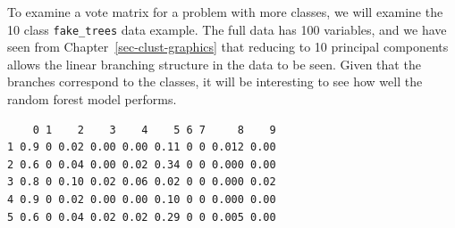 \documentclass[
  letterpaper,
]{krantz}
\newenvironment{Shaded}{\begin{snugshade}}{\end{snugshade}}
\newcommand{\AttributeTok}[1]{\textcolor[rgb]{0.40,0.45,0.13}{#1}}
\newcommand{\ConstantTok}[1]{\textcolor[rgb]{0.56,0.35,0.01}{#1}}
\newcommand{\DecValTok}[1]{\textcolor[rgb]{0.68,0.00,0.00}{#1}}
\newcommand{\FunctionTok}[1]{\textcolor[rgb]{0.28,0.35,0.67}{#1}}
\newcommand{\NormalTok}[1]{\textcolor[rgb]{0.00,0.23,0.31}{#1}}
\newcommand{\OtherTok}[1]{\textcolor[rgb]{0.00,0.23,0.31}{#1}}
\newcommand{\SpecialCharTok}[1]{\textcolor[rgb]{0.37,0.37,0.37}{#1}}
\begin{document}
To examine a vote matrix for a problem with more classes, we will
examine the 10 class \texttt{fake\_trees} data example. The full data
has 100 variables, and we have seen from
Chapter~\ref{sec-clust-graphics} that reducing to 10 principal
components allows the linear branching structure in the data to be seen.
Given that the branches correspond to the classes, it will be
interesting to see how well the random forest model performs.


\begin{Shaded}
\end{Shaded}

\begin{Shaded}
\end{Shaded}

\begin{verbatim}
    0 1    2    3    4    5 6 7     8    9
1 0.9 0 0.02 0.00 0.00 0.11 0 0 0.012 0.00
2 0.6 0 0.04 0.00 0.02 0.34 0 0 0.000 0.00
3 0.8 0 0.10 0.02 0.06 0.02 0 0 0.000 0.02
4 0.9 0 0.02 0.00 0.00 0.10 0 0 0.000 0.00
5 0.6 0 0.04 0.02 0.02 0.29 0 0 0.005 0.00
\end{verbatim}
\end{document}
